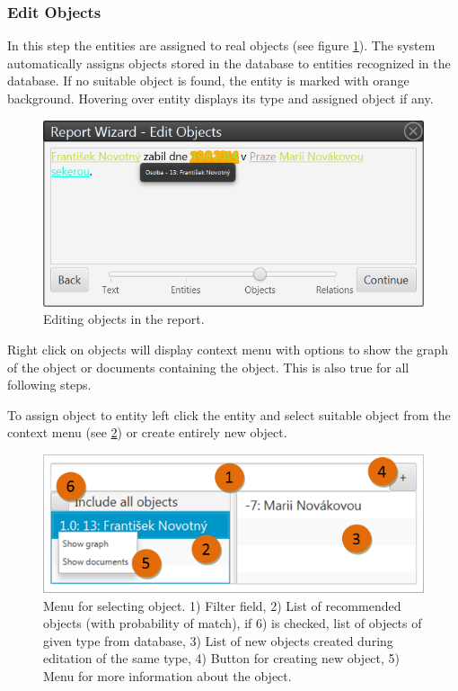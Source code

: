 \subsubsection{Edit Objects}
\label{sssec:EditObjects}

In this step the entities are assigned to real objects (see figure
\ref{fig:Objects}). The system automatically assigns objects stored in the
database to entities recognized in the database. If no suitable object is
found, the entity is marked with orange background. Hovering over entity
displays its type and assigned object if any.

\begin{figure}[!htb]
        \centering
        \includegraphics[width=\textwidth]{Images/objects}
        \caption{Editing objects in the report.}
        \label{fig:Objects}
\end{figure}

Right click on objects will display context menu with options to show the graph
of the object or documents containing the object. This is also true for all following steps.

To assign object to entity left click the entity and select suitable object
from the context menu (see \ref{fig:ObjectMenu}) or create entirely new object.

\begin{figure}[!htb]
        \centering
        \includegraphics[width=\textwidth]{Images/objectmenu}
        \caption{Menu for selecting object. 1) Filter field, 2) List of
		 recommended objects (with probability of match), if 6) is checked, list
		 of objects of given type from database, 3) List of new objects created
		 during editation of the same type, 4) Button for creating new object,
		 5) Menu for more information about the object.}
        \label{fig:ObjectMenu}
\end{figure}

